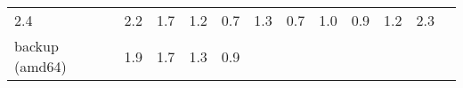 \documentclass[parskip=half]{scrartcl}
\begin{document}
\begin{table}[h]
\begin{tabular}{@{}llllllllllll@{}}
\begin{minipage}[t]{0.05\columnwidth}
2.4\strut
\end{minipage} & \begin{minipage}[t]{0.05\columnwidth}\raggedright\strut
2.2\strut
\end{minipage} & \begin{minipage}[t]{0.05\columnwidth}\raggedright\strut
1.7\strut
\end{minipage} & \begin{minipage}[t]{0.05\columnwidth}\raggedright\strut
1.2\strut
\end{minipage} & \begin{minipage}[t]{0.05\columnwidth}\raggedright\strut
0.7\strut
\end{minipage} & \begin{minipage}[t]{0.05\columnwidth}\raggedright\strut
1.3\strut
\end{minipage} & \begin{minipage}[t]{0.05\columnwidth}\raggedright\strut
0.7\strut
\end{minipage} & \begin{minipage}[t]{0.05\columnwidth}\raggedright\strut
1.0\strut
\end{minipage} & \begin{minipage}[t]{0.05\columnwidth}\raggedright\strut
0.9\strut
\end{minipage} & \begin{minipage}[t]{0.05\columnwidth}\raggedright\strut
1.2\strut
\end{minipage} & \begin{minipage}[t]{0.05\columnwidth}\raggedright\strut
2.3\strut
\end{minipage}\tabularnewline
\begin{minipage}[t]{0.12\columnwidth}\raggedright\strut
backup (amd64)\strut
\end{minipage} & \begin{minipage}[t]{0.05\columnwidth}\raggedright\strut
1.9\strut
\end{minipage} & \begin{minipage}[t]{0.05\columnwidth}\raggedright\strut
1.7\strut
\end{minipage} & \begin{minipage}[t]{0.05\columnwidth}\raggedright\strut
1.3\strut
\end{minipage} & \begin{minipage}[t]{0.05\columnwidth}\raggedright\strut
0.9\strut
\end{minipage} & \begin{minipage}[t]{0.05\columnwidth}\raggedright\strut

\end{minipage}
\end{tabular}
\end{table}
\end{document}
